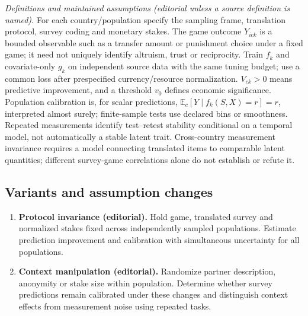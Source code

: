 \documentclass[11pt,a4paper]{article}
\begin{document}
\emph{Definitions and maintained assumptions (editorial unless a source definition is named).} For each country/population specify the sampling frame, translation protocol, survey coding and monetary stakes. The game outcome \(Y_{ick}\) is a bounded observable such as a transfer amount or punishment choice under a fixed game; it need not uniquely identify altruism, trust or reciprocity. Train \(f_k\) and covariate-only \(g_k\) on independent source data with the same tuning budget; use a common loss after prespecified currency/resource normalization. \(V_{ck}>0\) means predictive improvement, and a threshold \(v_0\) defines economic significance. Population calibration is, for scalar predictions, \(\mathbb E_c[Y\mid f_k(S,X)=r]=r\), interpreted almost surely; finite-sample tests use declared bins or smoothness. Repeated measurements identify test--retest stability conditional on a temporal model, not automatically a stable latent trait. Cross-country measurement invariance requires a model connecting translated items to comparable latent quantities; different survey-game correlations alone do not establish or refute it.
\subsection*{Variants and assumption changes}
\begin{enumerate}
\item \textbf{Protocol invariance (editorial).} Hold game, translated survey and normalized stakes fixed across independently sampled populations. Estimate prediction improvement and calibration with simultaneous uncertainty for all populations.
\item \textbf{Context manipulation (editorial).} Randomize partner description, anonymity or stake size within population. Determine whether survey predictions remain calibrated under these changes and distinguish context effects from measurement noise using repeated tasks.
\end{enumerate}
\end{document}
